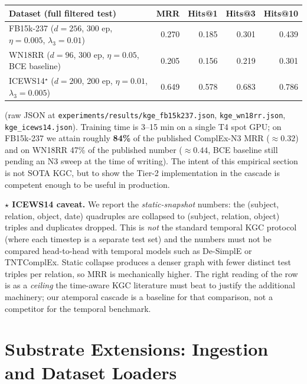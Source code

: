 \documentclass[11pt]{article}
\theoremstyle{plain}
\begin{document}
\begin{center}\small
\begin{tabular}{lrrrr}
\toprule
Dataset (full filtered test) & MRR & Hits@1 & Hits@3 & Hits@10 \\
\midrule
FB15k-237 ($d=256$, 300 ep, $\eta=0.005$, $\lambda_3=0.01$)
                                                  & 0.270 & 0.185 & 0.301 & 0.439 \\
WN18RR    ($d=96$,  300 ep, $\eta=0.05$, BCE baseline)
                                                  & 0.205 & 0.156 & 0.219 & 0.301 \\
ICEWS14$^\star$ ($d=200$, 200 ep, $\eta=0.01$, $\lambda_3=0.005$)
                                                  & 0.649 & 0.578 & 0.683 & 0.786 \\
\bottomrule
\end{tabular}
\end{center}

{\sloppy\noindent (raw JSON at \texttt{experiments/results/kge\_fb15k237.json},
\texttt{kge\_wn18rr.json}, \texttt{kge\_icews14.json}).  Training time
is 3--15 min on a single T4 spot GPU; on FB15k-237 we attain
roughly \textbf{84\%} of the published ComplEx-N3 MRR
($\approx 0.32$) and on WN18RR 47\% of the published number
($\approx 0.44$, BCE baseline still pending an N3 sweep at the time
of writing).  The intent of this empirical section is not SOTA KGC,
but to show the Tier-2 implementation in the cascade is competent
enough to be useful in production.\par}

\par\noindent\textbf{$\star$ ICEWS14 caveat.} We report the
\emph{static-snapshot} numbers: the (subject, relation, object, date)
quadruples are collapsed to (subject, relation, object) triples and
duplicates dropped.  This is \emph{not} the standard temporal KGC
protocol (where each timestep is a separate test set) and the
numbers must not be compared head-to-head with temporal models such
as De-SimplE \cite{garcia2020desimple} or TNTComplEx.  Static
collapse produces a denser graph with fewer distinct test triples
per relation, so MRR is mechanically higher.  The right reading of
the row is as a \emph{ceiling} the time-aware KGC literature must
beat to justify the additional machinery; our atemporal cascade is
a baseline for that comparison, not a competitor for the temporal
benchmark.

\section{Substrate Extensions: Ingestion and Dataset Loaders}
\label{sec:tier_a}
\end{document}
